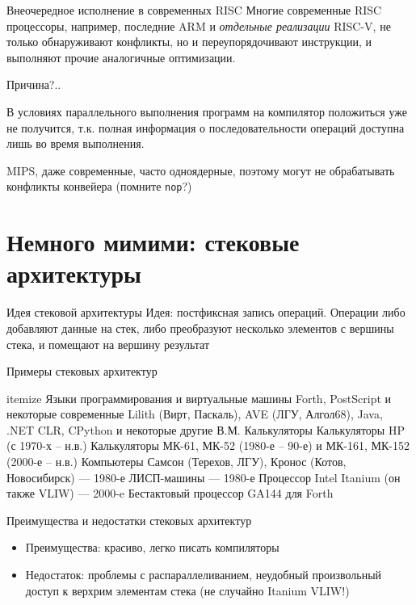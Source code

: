 \documentclass[xetex,aspectratio=43]{beamer}
\begin{document}
\begin{frame}{Внеочередное исполнение в современных RISC}
    Многие современные RISC процессоры, например, последние ARM и \emph{отдельные реализации} RISC-V, не только     обнаруживают конфликты, но и переупорядочивают инструкции, и выполняют
    прочие аналогичные оптимизации.

    Причина?..

    \pause

    В условиях параллельного выполнения программ на компилятор положиться
    уже не получится, т.к. полная информация о последовательности операций
    доступна лишь во время выполнения.

    MIPS, даже современные, часто одноядерные, поэтому могут не обрабатывать конфликты конвейера (помните \texttt{nop}?)
\end{frame}

\section{Немного мимими: стековые архитектуры}

\begin{frame}{Идея стековой архитектуры}
    Идея: постфиксная запись операций. Операции либо добавляют данные на стек, либо преобразуют несколько элементов с вершины стека, и помещают на вершину результат
\end{frame}

\begin{frame}{Примеры стековых архитектур}
    \begin{outline}{itemize}
        \1 Языки программирования и виртуальные машины
            \2 Forth, PostScript и некоторые современные
            \2 Lilith (Вирт, Паскаль), AVE (ЛГУ, Алгол68), Java, .NET CLR, CPython и некоторые другие В.М.
        \1 Калькуляторы
            \2 Калькуляторы HP (с 1970-х – н.в.)
            \2 Калькуляторы МК-61, МК-52 (1980-е – 90-е) и МК-161, МК-152 (2000-е – н.в.)
        \1 Компьютеры
            \2 Самсон (Терехов, ЛГУ), Кронос (Котов, Новосибирск) — 1980-е
            \2 ЛИСП-машины — 1980-е
            \2 Процессор Intel Itanium (он также VLIW) — 2000-e
            \2 Бестактовый процессор GA144 для Forth
    \end{outline}
\end{frame}

\begin{frame}{Преимущества и недостатки стековых архитектур}
    \begin{itemize}
        \item Преимущества: красиво, легко писать компиляторы
        \item Недостаток: проблемы с распараллеливанием, неудобный произвольный доступ к верхрим элементам стека (не случайно Itanium VLIW!)
    \end{itemize}
\end{frame}
\end{document}
